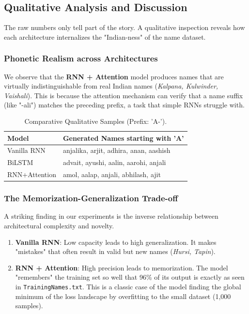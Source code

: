 \documentclass[12pt,a4paper]{article}
\begin{document}
\subsection{Qualitative Analysis and Discussion}
The raw numbers only tell part of the story. A qualitative inspection reveals how each architecture internalizes the "Indian-ness" of the name dataset.

\subsubsection{Phonetic Realism across Architectures}
We observe that the \textbf{RNN + Attention} model produces names that are virtually indistinguishable from real Indian names (\textit{Kalpana, Kulwinder, Vaishali}). This is because the attention mechanism can verify that a name suffix (like "-ali") matches the preceding prefix, a task that simple RNNs struggle with.

\begin{table}[H]
\centering
\caption{Comparative Qualitative Samples (Prefix: 'A-').}
\label{tab:prefix_samples}
\begin{tabular}{lp{10cm}}
\toprule
\textbf{Model} & \textbf{Generated Names starting with 'A'} \\
\midrule
Vanilla RNN & anjalika, arjit, adhira, anan, aashish \\
BiLSTM & advait, ayushi, aalin, aarohi, anjali \\
RNN+Attention & amol, aalap, anjali, abhilash, ajit \\
\bottomrule
\end{tabular}
\end{table}

\subsubsection{The Memorization-Generalization Trade-off}
A striking finding in our experiments is the inverse relationship between architectural complexity and novelty.
\begin{enumerate}
    \item \textbf{Vanilla RNN}: Low capacity leads to high generalization. It makes "mistakes" that often result in valid but new names (\textit{Hursi, Tapin}).
    \item \textbf{RNN + Attention}: High precision leads to memorization. The model "remembers" the training set so well that 96\% of its output is exactly as seen in \texttt{TrainingNames.txt}. This is a classic case of the model finding the global minimum of the loss landscape by overfitting to the small dataset (1,000 samples).
\end{enumerate}
\end{document}
